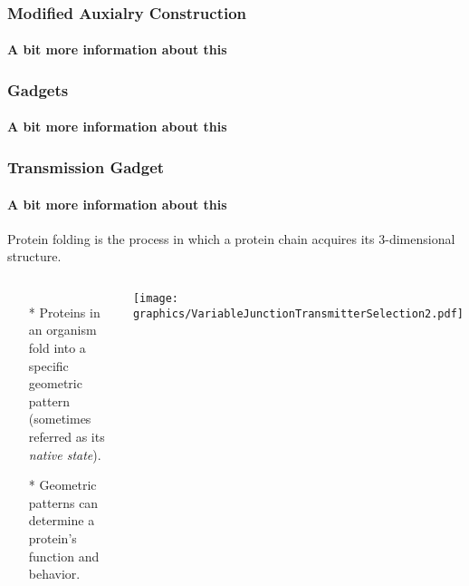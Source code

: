 \documentclass{beamer}
\begin{document}
  \begin{frame}
    \frametitle{Modified Auxialry Construction}
    \framesubtitle{A bit more information about this}
  \end{frame}
  \begin{frame}
    \frametitle{Gadgets}
    \framesubtitle{A bit more information about this}
  \end{frame}
  \begin{frame}
    \frametitle{Transmission Gadget}
    \framesubtitle{A bit more information about this}
      Protein folding is the process in which a protein chain acquires its 3-dimensional structure.
    \begin{columns}[c] %
     \begin{itemize}
     	\item[*] Proteins in an organism fold into a specific geometric pattern (sometimes referred as its \textit{native state}).
     	\item[*]  Geometric patterns can determine a protein's function and behavior. 
     \end{itemize}
	     \begin{minipage}{\linewidth}
		\begin{center}
		\texttt{[image: graphics/VariableJunctionTransmitterSelection2.pdf]}
		\label{fig:VariableJunctionTransmitterSelection.pdf}
		\end{center}
		\end{minipage} 
    \end{columns}
  \end{frame}
\end{document}
